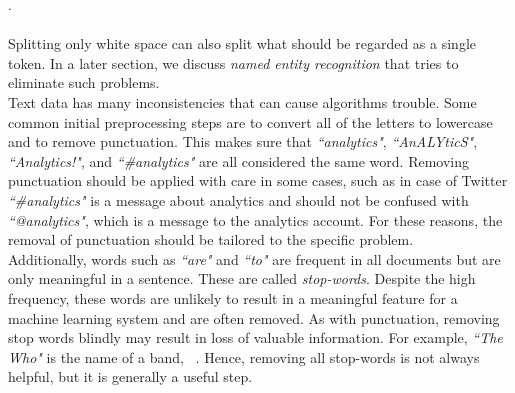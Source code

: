      .\\
\\
Splitting only  white space can also split what should be regarded as a single token. In a later section, we discuss \emph{named entity recognition} that tries to eliminate such problems.  \\
\noindent
Text data has  many inconsistencies that can cause algorithms trouble. Some common initial preprocessing steps are to convert all of the letters to lowercase and to remove punctuation. 
This makes sure that \emph{``analytics"}, \emph{``AnALYticS"}, \emph{``Analytics!"}, and \emph{``\#analytics"} are all considered the same word. Removing punctuation should be applied with care  in some cases, such as in case of Twitter \emph{``\#analytics"} is a message about analytics and should not be confused with \emph{``@analytics"}, which is a message to the analytics account. For these reasons, the removal of punctuation should be tailored to the specific problem.\\
Additionally, words such as \emph{``are"} and \emph{``to"} are frequent in all documents but are only meaningful in a sentence. These are called \emph{stop-words}. Despite the high frequency, these words are unlikely to result in a meaningful feature for a machine learning system and are often removed. As with punctuation, removing stop words blindly may result in loss of valuable information. For example, \emph{``The Who"} is the name of a band, ~. Hence, removing all stop-words is not always helpful, but it is generally  a useful step. 

